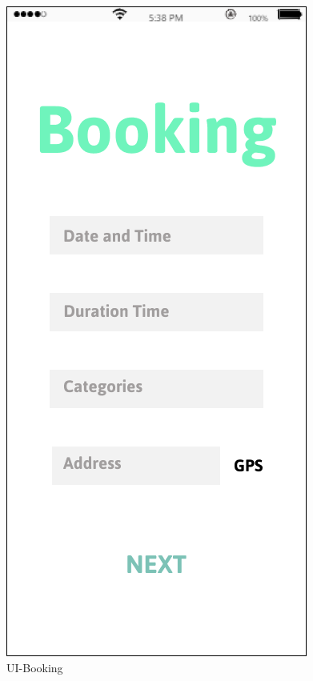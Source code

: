\documentclass[a4paper,12pt]{report}
\begin{document}
\begin{figure}[H]
\begin{minipage}[t]{0.5\linewidth}
		\includegraphics[scale=0.5]{UI-Booking.png}
		\caption{UI-Booking}
		\label{UI-Booking}
	\end{minipage}
\end{figure}
\end{document}
